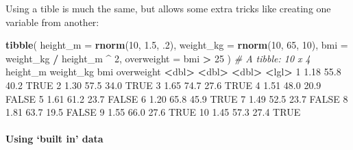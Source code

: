 \documentclass[]{article}
\newenvironment{Shaded}{\begin{snugshade}}{\end{snugshade}}
\newcommand{\CommentTok}[1]{\textcolor[rgb]{0.56,0.35,0.01}{\textit{#1}}}
\newcommand{\DataTypeTok}[1]{\textcolor[rgb]{0.13,0.29,0.53}{#1}}
\newcommand{\DecValTok}[1]{\textcolor[rgb]{0.00,0.00,0.81}{#1}}
\newcommand{\ErrorTok}[1]{\textcolor[rgb]{0.64,0.00,0.00}{\textbf{#1}}}
\newcommand{\FloatTok}[1]{\textcolor[rgb]{0.00,0.00,0.81}{#1}}
\newcommand{\KeywordTok}[1]{\textcolor[rgb]{0.13,0.29,0.53}{\textbf{#1}}}
\newcommand{\NormalTok}[1]{#1}
\newcommand{\OperatorTok}[1]{\textcolor[rgb]{0.81,0.36,0.00}{\textbf{#1}}}
\newcommand{\OtherTok}[1]{\textcolor[rgb]{0.56,0.35,0.01}{#1}}
\newcommand{\StringTok}[1]{\textcolor[rgb]{0.31,0.60,0.02}{#1}}
\let\oldparagraph\paragraph
\renewcommand{\paragraph}[1]{\oldparagraph{#1}\mbox{}}
\begin{document}
Using a tible is much the same, but allows some extra tricks like creating one
variable from another:

\begin{Shaded}
\begin{Highlighting}[]
\KeywordTok{tibble}\NormalTok{(}
    \DataTypeTok{height_m =} \KeywordTok{rnorm}\NormalTok{(}\DecValTok{10}\NormalTok{, }\FloatTok{1.5}\NormalTok{, }\FloatTok{.2}\NormalTok{),}
    \DataTypeTok{weight_kg =} \KeywordTok{rnorm}\NormalTok{(}\DecValTok{10}\NormalTok{, }\DecValTok{65}\NormalTok{, }\DecValTok{10}\NormalTok{),}
    \DataTypeTok{bmi =}\NormalTok{ weight_kg }\OperatorTok{/}\StringTok{ }\NormalTok{height_m }\OperatorTok{^}\StringTok{ }\DecValTok{2}\NormalTok{,}
    \DataTypeTok{overweight =}\NormalTok{ bmi }\OperatorTok{>}\StringTok{ }\DecValTok{25}
\NormalTok{)}
\CommentTok{# A tibble: 10 x 4}
\NormalTok{   height_m weight_kg   bmi overweight}
      \OperatorTok{<}\NormalTok{dbl}\OperatorTok{>}\StringTok{     }\ErrorTok{<}\NormalTok{dbl}\OperatorTok{>}\StringTok{ }\ErrorTok{<}\NormalTok{dbl}\OperatorTok{>}\StringTok{ }\ErrorTok{<}\NormalTok{lgl}\OperatorTok{>}\StringTok{     }
\StringTok{ }\DecValTok{1}     \FloatTok{1.18}      \FloatTok{55.8}  \FloatTok{40.2} \OtherTok{TRUE}      
 \DecValTok{2}     \FloatTok{1.30}      \FloatTok{57.5}  \FloatTok{34.0} \OtherTok{TRUE}      
 \DecValTok{3}     \FloatTok{1.65}      \FloatTok{74.7}  \FloatTok{27.6} \OtherTok{TRUE}      
 \DecValTok{4}     \FloatTok{1.51}      \FloatTok{48.0}  \FloatTok{20.9} \OtherTok{FALSE}     
 \DecValTok{5}     \FloatTok{1.61}      \FloatTok{61.2}  \FloatTok{23.7} \OtherTok{FALSE}     
 \DecValTok{6}     \FloatTok{1.20}      \FloatTok{65.8}  \FloatTok{45.9} \OtherTok{TRUE}      
 \DecValTok{7}     \FloatTok{1.49}      \FloatTok{52.5}  \FloatTok{23.7} \OtherTok{FALSE}     
 \DecValTok{8}     \FloatTok{1.81}      \FloatTok{63.7}  \FloatTok{19.5} \OtherTok{FALSE}     
 \DecValTok{9}     \FloatTok{1.55}      \FloatTok{66.0}  \FloatTok{27.6} \OtherTok{TRUE}      
\DecValTok{10}     \FloatTok{1.45}      \FloatTok{57.3}  \FloatTok{27.4} \OtherTok{TRUE}      
\end{Highlighting}
\end{Shaded}

\hypertarget{built-in-data}{%
\paragraph{Using `built in' data}\label{built-in-data}}
\end{document}
